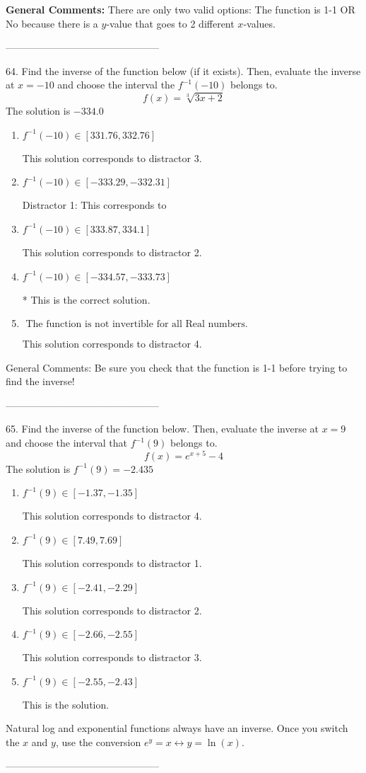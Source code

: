 \documentclass{extbook}[14pt]
\begin{document}
\textbf{General Comments:} There are only two valid options: The function is 1-1 OR No because there is a $y$-value that goes to 2 different $x$-values.

-----------------------------------------------

64. Find the inverse of the function below (if it exists). Then, evaluate the inverse at $x = -10$ and choose the interval the $f^{-1}(-10)$ belongs to.
\[ f(x) = \sqrt[3]{3 x + 2} \] 
The solution is $ -334.0 $ 

\begin{enumerate}[label=\Alph*.] 
\item $ f^{-1}(-10) \in [331.76, 332.76] $ 

  This solution corresponds to distractor 3. 
\item $ f^{-1}(-10) \in [-333.29, -332.31] $ 

  Distractor 1: This corresponds to  
\item $ f^{-1}(-10) \in [333.87, 334.1] $ 

  This solution corresponds to distractor 2. 
\item $ f^{-1}(-10) \in [-334.57, -333.73] $ 

 * This is the correct solution. 
\item $ \text{ The function is not invertible for all Real numbers. } $ 

  This solution corresponds to distractor 4. 
\end{enumerate} 
 
General Comments: Be sure you check that the function is 1-1 before trying to find the inverse!

-----------------------------------------------

65. Find the inverse of the function below. Then, evaluate the inverse at $x = 9$ and choose the interval that $f^{-1}(9)$ belongs to.
\[ f(x) = e^{x+5}-4 \] 
The solution is $ f^{-1}(9) = -2.435 $ 

\begin{enumerate}[label=\Alph*.] 
\item $ f^{-1}(9) \in [-1.37, -1.35] $ 

  This solution corresponds to distractor 4. 
\item $ f^{-1}(9) \in [7.49, 7.69] $ 

  This solution corresponds to distractor 1. 
\item $ f^{-1}(9) \in [-2.41, -2.29] $ 

  This solution corresponds to distractor 2. 
\item $ f^{-1}(9) \in [-2.66, -2.55] $ 

  This solution corresponds to distractor 3. 
\item $ f^{-1}(9) \in [-2.55, -2.43] $ 

  This is the solution. 
\end{enumerate} 
 
Natural log and exponential functions always have an inverse. Once you switch the $x$ and $y$, use the conversion $ e^y = x \leftrightarrow y=\ln(x)$.

-----------------------------------------------
\end{document}
